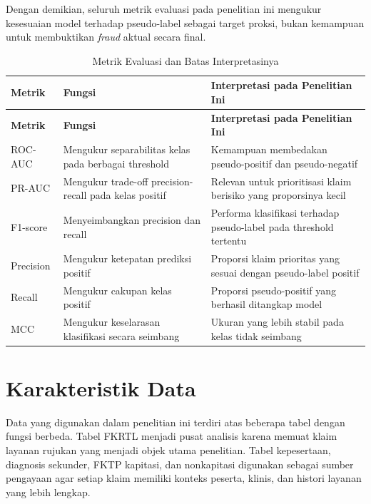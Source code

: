 Dengan demikian, seluruh metrik evaluasi pada penelitian ini mengukur kesesuaian model terhadap pseudo-label sebagai target proksi, bukan kemampuan untuk membuktikan \emph{fraud} aktual secara final.

\begin{longtable}[]{@{}p{}p{}p{}@{}}
\caption{Metrik Evaluasi dan Batas Interpretasinya}\label{tab:metrik-evaluasi-bab4}\\
\toprule
\textbf{Metrik} & \textbf{Fungsi} & \textbf{Interpretasi pada Penelitian Ini} \\
\midrule
\endfirsthead
\toprule
\textbf{Metrik} & \textbf{Fungsi} & \textbf{Interpretasi pada Penelitian Ini} \\
\midrule
\endhead
\bottomrule
\endfoot
ROC-AUC & Mengukur separabilitas kelas pada berbagai threshold & Kemampuan membedakan pseudo-positif dan pseudo-negatif \\
PR-AUC & Mengukur trade-off precision-recall pada kelas positif & Relevan untuk prioritisasi klaim berisiko yang proporsinya kecil \\
F1-score & Menyeimbangkan precision dan recall & Performa klasifikasi terhadap pseudo-label pada threshold tertentu \\
Precision & Mengukur ketepatan prediksi positif & Proporsi klaim prioritas yang sesuai dengan pseudo-label positif \\
Recall & Mengukur cakupan kelas positif & Proporsi pseudo-positif yang berhasil ditangkap model \\
MCC & Mengukur keselarasan klasifikasi secara seimbang & Ukuran yang lebih stabil pada kelas tidak seimbang \\
\end{longtable}

\section{Karakteristik Data}\label{karakteristik-data}

Data yang digunakan dalam penelitian ini terdiri atas beberapa tabel dengan fungsi berbeda. Tabel FKRTL menjadi pusat analisis karena memuat klaim layanan rujukan yang menjadi objek utama penelitian. Tabel kepesertaan, diagnosis sekunder, FKTP kapitasi, dan nonkapitasi digunakan sebagai sumber pengayaan agar setiap klaim memiliki konteks peserta, klinis, dan histori layanan yang lebih lengkap.

